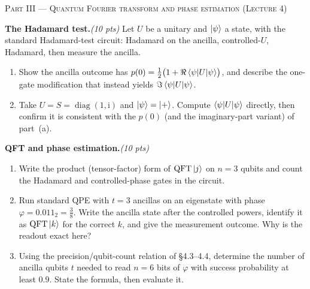 \documentclass[11pt]{article}
\newcommand{\ii}{\mathrm{i}}
\DeclareMathOperator{\diag}{diag}
\newcommand{\QFT}{\mathrm{QFT}}
\newcommand{\pts}[1]{\hfill{\normalfont\itshape(#1 pts)}}
\begin{document}
\bigskip
\noindent\textsc{Part III --- Quantum Fourier transform and phase estimation (Lecture 4)}
\begin{problems}\setcounter{problemsi}{6}

\item \textbf{The Hadamard test.}\pts{10}
Let $U$ be a unitary and $\ket{\psi}$ a state, with the standard Hadamard-test
circuit: Hadamard on the ancilla, controlled-$U$, Hadamard, then measure the ancilla.
\begin{enumerate}[label=(\alph*),nosep,leftmargin=2em]
  \item Show the ancilla outcome has $p(0)=\tfrac12\bigl(1+\Re\braket{\psi|U|\psi}\bigr)$,
        and describe the one-gate modification that instead yields
        $\Im\braket{\psi|U|\psi}$.
  \item Take $U=S=\diag(1,\ii)$ and $\ket{\psi}=\ket{+}$. Compute $\braket{\psi|U|\psi}$
        directly, then confirm it is consistent with the $p(0)$ (and the imaginary-part
        variant) of part~(a).
\end{enumerate}

\item \textbf{QFT and phase estimation.}\pts{10}
\begin{enumerate}[label=(\alph*),nosep,leftmargin=2em]
  \item Write the product (tensor-factor) form of $\QFT\ket{j}$ on $n=3$ qubits and
        count the Hadamard and controlled-phase gates in the circuit.
  \item Run standard QPE with $t=3$ ancillas on an eigenstate with phase
        $\varphi=0.011_2=\tfrac38$. Write the ancilla state after the controlled
        powers, identify it as $\QFT\ket{k}$ for the correct $k$, and give the
        measurement outcome. Why is the readout exact here?
  \item Using the precision/qubit-count relation of \S4.3--4.4, determine the number
        of ancilla qubits $t$ needed to read $n=6$ bits of $\varphi$ with success
        probability at least $0.9$. State the formula, then evaluate it.
\end{enumerate}

\end{problems}
\end{document}
